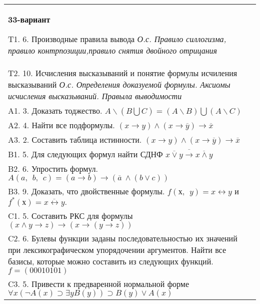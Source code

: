 \documentclass{article}
\begin{document}
\begin{tabular}{m{17cm}}
\textbf{33-вариант}
\newline

T1. 6. Производные правила вывода \emph{О.с. Правило силлогизма, правило контрпозиции,правило снятия двойного отрицания} \\
T2. 10. Исчисления высказываний и понятие формулы исчиления высказываний \emph{О.с. Определения доказуемой формулы. Аксиомы исчисления высказываний. Правыла выводимости} \\
A1. 3. Доказать тоджество. \(A\backslash(B\bigcup C) = (A\backslash B)\bigcup(A\backslash C)\) \\
A2. 4. Найти все подформулы. \((x \rightarrow y) \land (x \rightarrow \overline{y}) \rightarrow \overline{x}\) \\
A3. 2. Составить таблица истинности. \((x \rightarrow y) \land (x \rightarrow \overline{y}) \rightarrow \overline{x}\) \\
B1. 5. Для следующих формул найти СДНФ \(\overline{\overline{x \vee y} \rightarrow \overline{x \land y}}\) \\
B2. 6. Упростить формул. \(A(a,\ \ b,\ \ c) = (a \rightarrow b) \rightarrow (\overline{a}\  \land (b \vee c))\) \\
B3. 9. Доказать, что двойственные формулы. \(f(х,\ \ y) = x \leftrightarrow y\) и \(f^{*}(х) = \overline{x \leftrightarrow y}.\) \\
C1. 5. Составить РКС для формулы \((x \land y \rightarrow z) \rightarrow (x \rightarrow (y \rightarrow z))\) \\
C2. 6. Булевы функции заданы последовательностью их значений при лексикографическом упорядочении аргументов. Найти все базисы, которые можно составить из следующих функций. \(f = (00010101)\) \\
C3. 5. Привести к предваренной нормальной форме \(\forall x(\neg A(x) \supset \exists yB(y)) \supset B(y) \vee A(x)\) \\

\end{tabular}
\vspace{1cm}
\end{document}
